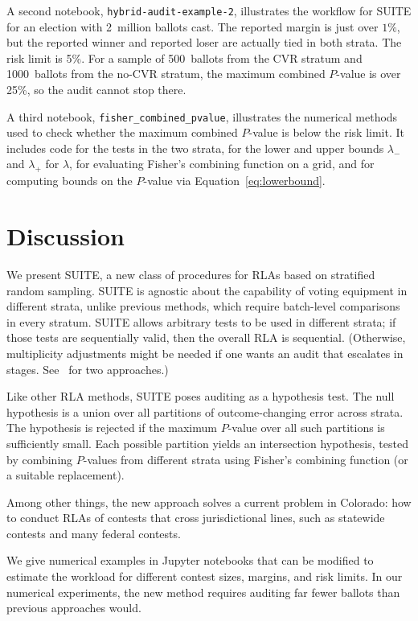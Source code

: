 \documentclass[runningheads]{llncs}
\begin{document}
A second notebook, \texttt{hybrid-audit-example-2}, illustrates the 
workflow for SUITE for an election with 2~million ballots cast.
The reported margin is just over $1\%$, but the reported winner
and reported loser are actually tied in both strata.  
The risk limit is 5\%.
For a sample of 500~ballots from the CVR stratum and 1000~ballots from the no-CVR stratum, 
the maximum combined $P$-value is over 25\%, so the audit cannot stop there.

A third notebook, \texttt{fisher\_combined\_pvalue}, illustrates the numerical methods used
to check whether the maximum combined $P$-value is below the risk limit.
It includes code for the tests in the two strata,
for the lower and upper bounds $\lambda_-$ and $\lambda_+$ for $\lambda$,
for evaluating Fisher's combining function on a grid,
and for computing bounds on the $P$-value via Equation~\ref{eq:lowerbound}.

\section{Discussion} \label{sec:discussion}

We present SUITE, a new class of procedures for RLAs based on stratified random sampling.
SUITE is agnostic about the capability of voting equipment in different strata, unlike
previous methods, which require batch-level comparisons in every stratum.
SUITE allows arbitrary tests to be used in different strata; if those tests are sequentially valid, then the overall RLA is sequential. 
(Otherwise, multiplicity adjustments might be needed if one wants an audit that escalates in stages.
See~\cite{stark08a,stark09a} for two approaches.)

Like other RLA methods, SUITE poses auditing as a hypothesis test.
The null hypothesis is a union over all partitions of outcome-changing error across strata.
The hypothesis is rejected if the maximum $P$-value over all such partitions is sufficiently
small.
Each possible partition yields an intersection hypothesis, tested by
combining $P$-values from different strata using Fisher's combining function (or a suitable
replacement). 

Among other things, the new approach solves a current problem in Colorado:
how to conduct RLAs of contests that cross jurisdictional lines, such as statewide 
contests and many federal contests.

We give numerical examples in Jupyter notebooks
that can be modified to estimate the workload for different contest sizes, margins, and risk limits.
In our numerical experiments, the new method requires auditing far fewer ballots than previous approaches would. 
\end{document}
